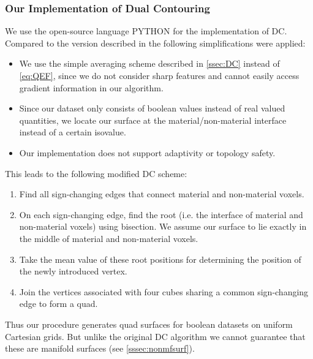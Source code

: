 \subsubsection{Our Implementation of Dual Contouring}
We use the open-source language PYTHON \cite{Python} for the implementation of \ac{DC}. Compared to the version described in \cite{Hermite2002} the following simplifications were applied:
\begin{itemize}
\item We use the simple averaging scheme described in \autoref{ssec:DC} instead of \autoref{eq:QEF}, since we do not consider sharp features and cannot easily access gradient information in our algorithm. 
\item Since our dataset only consists of boolean values instead of real valued quantities, we locate our surface at the material/non-material interface instead of a certain isovalue.
\item Our implementation does not support adaptivity or topology safety.
\end{itemize}
This leads to the following modified \ac{DC} scheme:
\begin{enumerate}
\item Find all sign-changing edges that connect material and non-material voxels.
\item On each sign-changing edge, find the root (i.e. the interface of material and non-material voxels) using bisection. We assume our surface to lie exactly in the middle of material and non-material voxels.
\item Take the mean value of these root positions for determining the position of the newly introduced vertex.
\item Join the vertices associated with four cubes sharing a common sign-changing edge to form a \ac{quad}.
\end{enumerate}
Thus our procedure generates \ac{quad} surfaces for boolean datasets on uniform Cartesian grids. But unlike the original \ac{DC} algorithm we cannot guarantee that these are manifold surfaces (see \autoref{sssec:nonmfsurf}).

